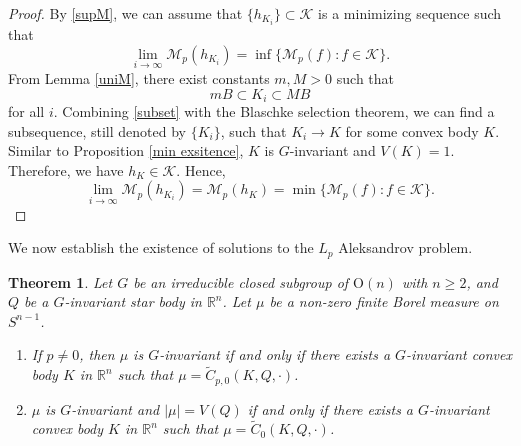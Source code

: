 \documentclass[12pt, reqno]{amsart}
\newtheorem{theorem}{Theorem}[section]
\theoremstyle{definition}
\theoremstyle{remark}
\numberwithin{equation}{section}
\begin{document}
\begin{proof}
By \eqref{supM}, we can assume that $\{h_{K_{i}}\}\subset\mathcal{K}$ is a minimizing sequence such that 
	$$\lim_{i \to \infty}\mathcal{M}_{p}(h_{K_{i}})=\inf \{\mathcal{M}_{p}(f): f\in \mathcal{K}\}.$$
	From Lemma \ref{uniM},  there exist  constants $m, M>0$ such that
	\begin{equation} \label{subset}
	mB\subset	K_{i}\subset MB
	\end{equation}
	for all $i$.  Combining \eqref{subset} with the   Blaschke selection theorem, we can find a subsequence, still denoted by $\{K_{i}\}$, such that $K_{i}\rightarrow K$ for some  convex body $K$. Similar to Proposition \ref{min exsitence}, $K$ is $G$-invariant and $V(K) = 1$.
	Therefore, we have $h_{K}\in\mathcal{K}$. Hence, $$\lim_{i \to \infty}\mathcal{M}_{p}(h_{K_{i}})=\mathcal{M}_{p}(h_{K})=\min \{\mathcal{M}_{p}(f): f\in \mathcal{K}\}.$$ 
\end{proof}

We now establish the existence of solutions to the $L_p$ Aleksandrov problem.


\begin{theorem}\label{closed Aleksandrov}
	Let  $G$ be an  irreducible closed subgroup of $\mathrm{O}(n)$ with $n \geq 2$, and $Q$ be a $G$-invariant star body in $\mathbb{R}^n$. Let $\mu$ be a non-zero finite Borel measure  on $S^{n-1}$.
	\begin{enumerate}
		\item\label{item1} If $p\neq 0$, then	$\mu$ is $G$-invariant if and only if there exists a $G$-invariant convex body $K$ in $\mathbb{R}^n$ such that
		$\mu=\widetilde{C}_{p,0}(K, Q,\cdot)$.
		\item\label{item2} $\mu$ is $G$-invariant and $| \mu|=V(Q)$ if and only if there exists a $G$-invariant convex body $K$ in $\mathbb{R}^n$ such that
		$\mu=\widetilde{C}_{0}(K, Q,\cdot)$.
	\end{enumerate}

	
\end{theorem}
\end{document}
